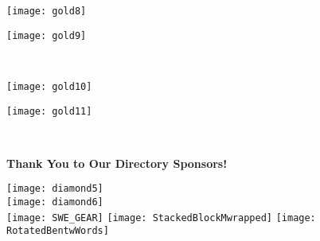 \documentclass[twoside]{article}
\begin{document}
\begin{center}
        \hspace{1em}\begin{minipage}{0.3\textwidth}\begin{center}\texttt{[image: gold8]}\vfill\end{center}\end{minipage}
        \hspace{1em}\begin{minipage}{0.3\textwidth}\begin{center}\texttt{[image: gold9]}\vfill\end{center}\end{minipage}
        \\
            \begin{minipage}{0.3\textwidth}\begin{center}\texttt{[image: gold10]}\vfill\end{center}\end{minipage}
        \hspace{1em}\begin{minipage}{0.3\textwidth}\begin{center}\texttt{[image: gold11]}\vfill\end{center}\end{minipage}
        \\
            \end{center}
    \newpage
    \backcover
    { \fontsize{16}{19}\selectfont \bf Thank You to Our Directory Sponsors!}\\
    \begin{center}
    \vfill
    \texttt{[image: diamond5]}\\[3em]
        \texttt{[image: diamond6]}\\[3em]
        \vfill
    \texttt{[image: SWE\_GEAR]}\hspace{3em}
    \texttt{[image: StackedBlockMwrapped]}\hspace{3em}
    \texttt{[image: RotatedBentwWords]}
    \end{center}
    
\end{document}
